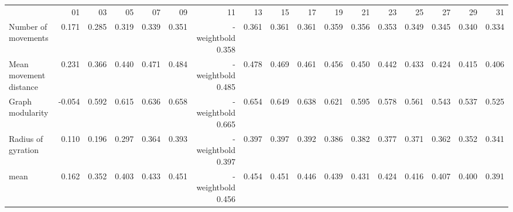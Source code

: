 \begin{tabular}{lrrrrrrrrrrrrrrrr}
 & 01 & 03 & 05 & 07 & 09 & 11 & 13 & 15 & 17 & 19 & 21 & 23 & 25 & 27 & 29 & 31 \\
Number of movements & 0.171 & 0.285 & 0.319 & 0.339 & 0.351 & \font-weightbold 0.358 & 0.361 & 0.361 & 0.361 & 0.359 & 0.356 & 0.353 & 0.349 & 0.345 & 0.340 & 0.334 \\
Mean movement distance & 0.231 & 0.366 & 0.440 & 0.471 & 0.484 & \font-weightbold 0.485 & 0.478 & 0.469 & 0.461 & 0.456 & 0.450 & 0.442 & 0.433 & 0.424 & 0.415 & 0.406 \\
Graph modularity & -0.054 & 0.592 & 0.615 & 0.636 & 0.658 & \font-weightbold 0.665 & 0.654 & 0.649 & 0.638 & 0.621 & 0.595 & 0.578 & 0.561 & 0.543 & 0.537 & 0.525 \\
Radius of gyration & 0.110 & 0.196 & 0.297 & 0.364 & 0.393 & \font-weightbold 0.397 & 0.397 & 0.397 & 0.392 & 0.386 & 0.382 & 0.377 & 0.371 & 0.362 & 0.352 & 0.341 \\
mean & 0.162 & 0.352 & 0.403 & 0.433 & 0.451 & \font-weightbold 0.456 & 0.454 & 0.451 & 0.446 & 0.439 & 0.431 & 0.424 & 0.416 & 0.407 & 0.400 & 0.391 \\
\end{tabular}
